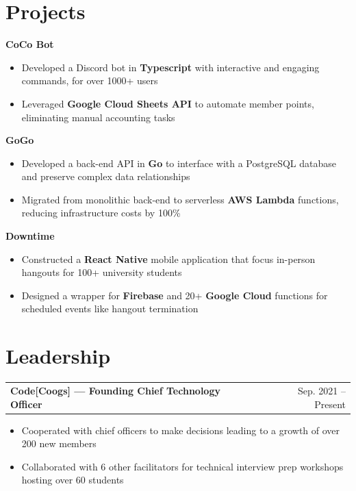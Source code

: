\documentclass[10pt,letterpaper]{article}
\makeatletter
\newcommand{\resumeHeading}[2]{%
    \noindent
    \begin{tabular*}{\textwidth}
        {@{}l@{\extracolsep{\fill}}r@{}}
        \textbf{#1} & #2
    \end{tabular*}%
}
\newcommand{\resumeProject}[1]{%
    \textbf{#1}\par
}
\newcommand{\resumeBulletsStart}{%
    \begin{itemize}
}
\newcommand{\resumeBulletsEnd}{%
    \end{itemize}
}
\makeatother
\begin{document}
\section{Projects}

\resumeProject{CoCo Bot}

\resumeBulletsStart
    \item Developed a Discord bot in \textbf{Typescript} with interactive and engaging commands, for over 1000+ users
    \item Leveraged \textbf{Google Cloud Sheets API} to automate member points, eliminating manual accounting tasks
\resumeBulletsEnd

\vspace{5pt}

\resumeProject{GoGo}

\resumeBulletsStart
    \item Developed a back-end API in \textbf{Go} to interface with a PostgreSQL database and preserve complex data relationships
    \item Migrated from monolithic back-end to serverless \textbf{AWS Lambda} functions, reducing infrastructure costs by 100\%
\resumeBulletsEnd

\vspace{5pt}

\resumeProject{Downtime}

\resumeBulletsStart
    \item Constructed a \textbf{React Native} mobile application that focus in-person hangouts for 100+ university students
    \item Designed a wrapper for \textbf{Firebase} and 20+ \textbf{Google Cloud} functions for scheduled events like hangout termination
\resumeBulletsEnd


\section{Leadership}

\resumeHeading
    {Code[Coogs] --- Founding Chief Technology Officer}
    {Sep. 2021 -- Present}

\resumeBulletsStart
    \item Cooperated with chief officers to make decisions leading to a growth of over 200 new members
    \item Collaborated with 6 other facilitators for technical interview prep workshops hosting over 60 students
\resumeBulletsEnd
\end{document}
